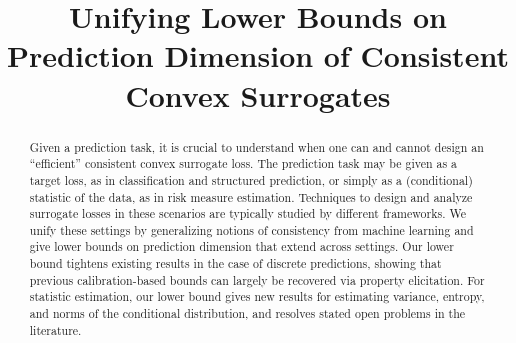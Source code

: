 \documentclass[anon,12pt]{colt2021} %
\title{Unifying Lower Bounds on Prediction Dimension of Consistent Convex Surrogates}
\begin{document}
\maketitle

\begin{abstract}
  Given a prediction task, it is crucial to understand when one can and cannot design an ``efficient'' consistent convex surrogate loss.
  The prediction task may be given as a target loss, as in classification and structured prediction, or simply as a (conditional) statistic of the data, as in risk measure estimation.
  Techniques to design and analyze surrogate losses in these scenarios are typically studied by different frameworks.%
We unify these settings by generalizing notions of consistency from machine learning and give lower bounds on prediction dimension that extend across settings.
Our lower bound tightens existing results in the case of discrete predictions, showing that previous calibration-based bounds can largely be recovered via property elicitation.
For statistic estimation, our lower bound gives new results for estimating variance, entropy, and norms of the conditional distribution, and resolves stated open problems in the literature.
%
%
\end{abstract}
\end{document}
